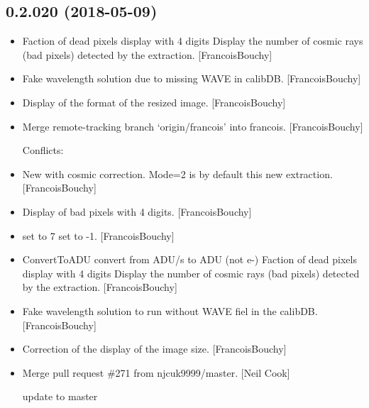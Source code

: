\documentclass[a4paper,10pt,english]{report}
\begin{document}
\subsection{0.2.020 (2018-05-09)}
\label{\detokenize{misc/changelog:id441}}\begin{itemize}
\item {} 
Faction of dead pixels display with 4 digits Display the number of
cosmic rays (bad pixels) detected by the extraction. {[}FrancoisBouchy{]}

\item {} 
Fake wavelength solution due to missing WAVE in calibDB.
{[}FrancoisBouchy{]}

\item {} 
Display of the format of the resized image. {[}FrancoisBouchy{]}

\item {} 
Merge remote-tracking branch ‘origin/francois’ into francois.
{[}FrancoisBouchy{]}
\begin{description}
\item[{Conflicts:}] \leavevmode
{}

\end{description}

\item {} 
New  with cosmic correction. Mode=2 is by
default this new extraction. {[}FrancoisBouchy{]}

\item {} 
Display of bad pixels with 4 digits. {[}FrancoisBouchy{]}

\item {} 
 set to 7  set to -1. {[}FrancoisBouchy{]}

\item {} 
ConvertToADU convert from ADU/s to ADU (not e-) Faction of dead pixels
display with 4 digits Display the number of cosmic rays (bad pixels)
detected by the extraction. {[}FrancoisBouchy{]}

\item {} 
Fake wavelength solution to run without WAVE fiel in the calibDB.
{[}FrancoisBouchy{]}

\item {} 
Correction of the display of the image size. {[}FrancoisBouchy{]}

\item {} 
Merge pull request \#271 from njcuk9999/master. {[}Neil Cook{]}

update to master

\end{itemize}
\end{document}
